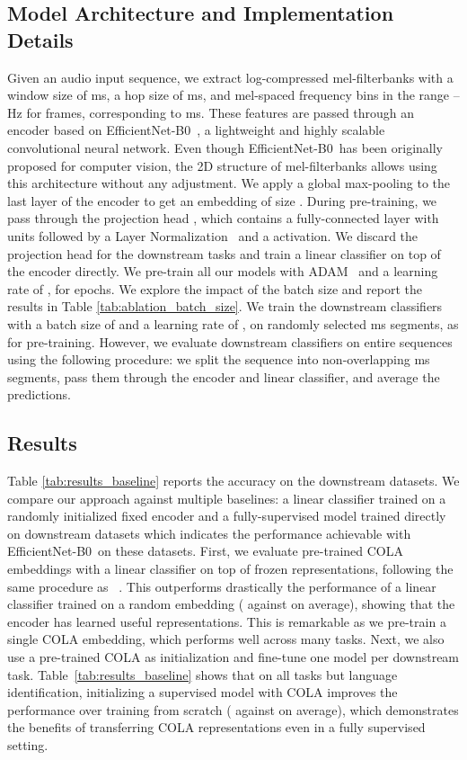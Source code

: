 \documentclass{article}
\newcommand{\ours}{COLA }
\newcommand{\efficientnet}{EfficientNet-B0~}
\begin{document}
\subsection{Model Architecture and Implementation Details}
Given an audio input sequence, we extract log-compressed mel-filterbanks with a window size of  ms, a hop size of  ms, and  mel-spaced frequency bins in the range – Hz for  frames, corresponding to  ms. These features are passed through an encoder  based on \efficientnet \cite{tan2019efficientnet}, a lightweight and highly scalable convolutional neural network. Even though \efficientnet has been originally proposed for computer vision, the 2D structure of mel-filterbanks allows using this architecture without any adjustment. We apply a global max-pooling to the last layer of the encoder to get an embedding  of size . During pre-training, we pass  through the projection head , which contains a fully-connected layer with  units followed by a Layer Normalization~\cite{ba2016layer} and a  activation.  We discard the projection head for the downstream tasks and train a linear classifier on top of the encoder directly. We pre-train all our models with ADAM~\cite{kingma2014adam} and a learning rate of , for  epochs. We explore the impact of the batch size and report the results in Table \ref{tab:ablation_batch_size}. We train the downstream classifiers with a batch size of  and a learning rate of , on randomly selected ms segments, as for pre-training. However, we evaluate downstream classifiers on entire sequences using the following procedure: we split the sequence into non-overlapping ms segments, pass them through the encoder and linear classifier, and average the predictions.

\subsection{Results}
\label{sec:results}

Table \ref{tab:results_baseline} reports the accuracy on the  downstream datasets. We compare our approach against multiple baselines: a linear classifier trained on a randomly initialized fixed encoder and a fully-supervised model trained directly on downstream datasets which indicates the performance achievable with \efficientnet on these datasets. First, we evaluate pre-trained \ours embeddings with a linear classifier on top of frozen representations, following the same procedure as ~\cite{tagliasacchi2019self, oord2018representation, chen2020simple, he2020momentum}. This outperforms drastically the performance of a linear classifier trained on a random embedding ( against  on average), showing that the encoder has learned useful representations. This is remarkable as we pre-train a single \ours embedding, which performs well across many tasks. Next, we also use a pre-trained \ours as initialization and fine-tune one model per downstream task. Table~\ref{tab:results_baseline} shows that on all tasks but language identification, initializing a supervised model with \ours improves the performance over training from scratch ( against  on average), which demonstrates the benefits of transferring \ours representations even in a fully supervised setting. 
\end{document}

